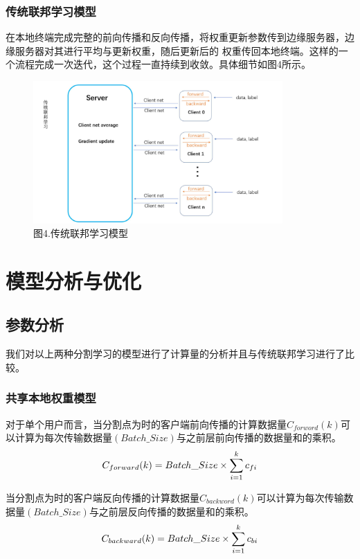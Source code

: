 \documentclass{article}
\begin{document}
\subsubsection{传统联邦学习模型}
在本地终端完成完整的前向传播和反向传播，将权重更新参数传到边缘服务器，边缘服务器对其进⾏平均与更新权重，随后更新后的
权重传回本地终端。这样的⼀个流程完成⼀次迭代，这个过程⼀直持续到收敛。具体细节如图4所示。

\begin{figure}[H]
    \centering
    \includegraphics[width=0.85\textwidth]{./figure/3.jpg}  
    \caption*{图4.传统联邦学习模型}
\end{figure}

\section{模型分析与优化}

\subsection{参数分析}
我们对以上两种分割学习的模型进⾏了计算量的分析并且与传统联邦学习进⾏了⽐较。
\subsubsection{共享本地权重模型}
对于单个⽤户⽽⾔，当分割点为时的客户端前向传播的计算数据量$C_{forword}(k)$可以计算为每次传输数据量$(Batch\_Size)$与之前层前向传播的数据量和的乘积。
\begin{equation}
    \centering
    C_{forward}(k)=Batch\_Size\times \sum_{i=1}^k c_{fi}
\end{equation}

当分割点为时的客户端反向传播的计算数据量$C_{backword}(k)$可以计算为每次传输数据量$(Batch\_Size)$与之前层反向传播的数据量和的乘积。
\begin{equation}
    \centering
    C_{backward}(k)=Batch\_Size\times \sum_{i=1}^k c_{bi}
\end{equation}
\end{document}
